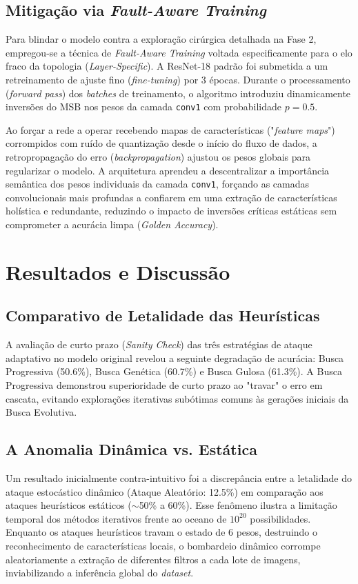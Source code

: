 \documentclass[11pt, a4paper]{article}
\begin{document}
\subsection{Mitigação via \textit{Fault-Aware Training}}
Para blindar o modelo contra a exploração cirúrgica detalhada na Fase 2, empregou-se a técnica de \textit{Fault-Aware Training} voltada especificamente para o elo fraco da topologia (\textit{Layer-Specific}).
A ResNet-18 padrão foi submetida a um retreinamento de ajuste fino (\textit{fine-tuning}) por 3 épocas. Durante o processamento (\textit{forward pass}) dos \textit{batches} de treinamento, o algoritmo introduziu dinamicamente inversões do MSB nos pesos da camada \texttt{conv1} com probabilidade $p=0.5$. 

Ao forçar a rede a operar recebendo mapas de características ("\textit{feature maps}") corrompidos com ruído de quantização desde o início do fluxo de dados, a retropropagação do erro (\textit{backpropagation}) ajustou os pesos globais para regularizar o modelo. A arquitetura aprendeu a descentralizar a importância semântica dos pesos individuais da camada \texttt{conv1}, forçando as camadas convolucionais mais profundas a confiarem em uma extração de características holística e redundante, reduzindo o impacto de inversões críticas estáticas sem comprometer a acurácia limpa (\textit{Golden Accuracy}).

\section{Resultados e Discussão}

\subsection{Comparativo de Letalidade das Heurísticas}
A avaliação de curto prazo (\textit{Sanity Check}) das três estratégias de ataque adaptativo no modelo original revelou a seguinte degradação de acurácia: Busca Progressiva (50.6\%), Busca Genética (60.7\%) e Busca Gulosa (61.3\%). A Busca Progressiva demonstrou superioridade de curto prazo ao "travar" o erro em cascata, evitando explorações iterativas subótimas comuns às gerações iniciais da Busca Evolutiva.

\subsection{A Anomalia Dinâmica vs. Estática}
Um resultado inicialmente contra-intuitivo foi a discrepância entre a letalidade do ataque estocástico dinâmico (Ataque Aleatório: 12.5\%) em comparação aos ataques heurísticos estáticos ($\sim$50\% a 60\%). Esse fenômeno ilustra a limitação temporal dos métodos iterativos frente ao oceano de $10^{20}$ possibilidades. Enquanto os ataques heurísticos travam o estado de 6 pesos, destruindo o reconhecimento de características locais, o bombardeio dinâmico corrompe aleatoriamente a extração de diferentes filtros a cada lote de imagens, inviabilizando a inferência global do \textit{dataset}.
\end{document}
